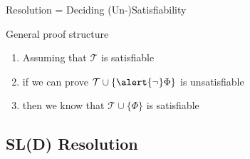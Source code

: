 \documentclass[presentation]{beamer}\mode<presentation>{\usetheme{AMSBolognaFC}}
\begin{document}
\begin{frame}[allowframebreaks]{Resolution = Deciding (Un-)Satisfiability}
    \begin{exampleblock}{General proof structure}
        \begin{enumerate}
            \item Assuming that $\mathcal{T}$ is satisfiable
            
            \item if we can prove $\mathcal{T} \cup \{ \alert{\neg} \Phi \}$ is unsatisfiable
            
            \item then we know that $\mathcal{T} \cup \{ \Phi \}$ is satisfiable
        \end{enumerate}
    \end{exampleblock}
\end{frame}

\subsection{SL(D) Resolution}
\end{document}
